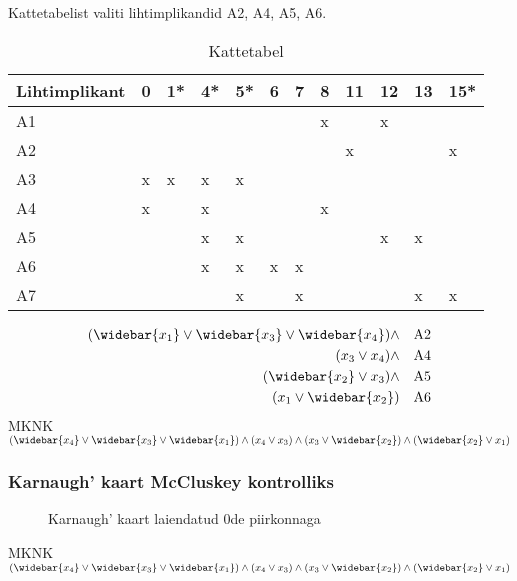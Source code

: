 \documentclass{article}
\newcommand{\wb}{\widebar}
\begin{document}
Kattetabelist valiti lihtimplikandid A2, A4, A5, A6.
\begin{table}[H]
\centering
\caption{Kattetabel}
\label{kattetabel}
\begin{tabular}{|l|l|l|l|l|l|l|l|l|l|l|l|}
\hline
Lihtimplikant & 0 & 1* & 4* & 5* & 6 & 7 & 8 & 11 & 12 & 13 & 15* \\ \hline
A1            &   &    &    &    &   &   & x &    & x  &    &     \\ \hline
\rowcolor{LightCyan}
A2            &   &    &    &    &   &   &   & x  &    &    & x   \\ \hline
A3            & x & x  & x  & x  &   &   &   &    &    &    &     \\ \hline
\rowcolor{LightCyan}
A4            & x &    & x  &    &   &   & x &    &    &    &     \\ \hline
\rowcolor{LightCyan}
A5            &   &    & x  & x  &   &   &   &    & x  & x  &     \\ \hline
\rowcolor{LightCyan}
A6            &   &    & x  & x  & x & x &   &    &    &    &     \\ \hline
A7            &   &    &    & x  &   & x &   &    &    & x  & x   \\ \hline
\end{tabular}
\end{table}
\begin{align*} 
(\wb{x_1}\lor\wb{x_3}\lor\wb{x_4})\land &&\mbox{A2}\\
(x_3\lor x_4)\land &&\mbox{A4}\\
(\wb{x_2} \lor x_3)\land &&\mbox{A5}\\
(x_1\lor \wb{x_2}) &&\mbox{A6}
\end{align*}
MKNK $(\wb{x_4} \lor \wb{x_3} \lor \wb{x_1}) \land (x_4 \lor x_3) \land (x_3 \lor \wb{x_2}) \land (\wb{x_2} \lor x_1)$

\subsubsection{Karnaugh' kaart McCluskey kontrolliks}
\begin{figure}[H]
\centering
\begin{Karnaugh}
\end{Karnaugh}
\caption{Karnaugh' kaart laiendatud 0de piirkonnaga}
\label{fig:karnaugh-piirkond0}
\end{figure}
MKNK $(\wb{x_4} \lor \wb{x_3} \lor \wb{x_1}) \land (x_4 \lor x_3) \land (x_3 \lor \wb{x_2}) \land (\wb{x_2} \lor x_1)$
\end{document}
